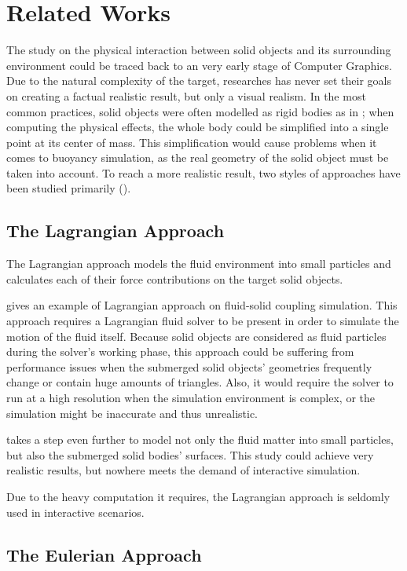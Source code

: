 \section{Related Works}

The study on the physical interaction between solid objects and its surrounding environment could be traced back to an very early stage of Computer Graphics.
Due to the natural complexity of the target, researches has never set their goals on creating a factual realistic result, but only a visual realism.
In the most common practices, solid objects were often modelled as rigid bodies as in \cite{BAR01}; when computing the physical effects, the whole body could be simplified into a single point at its center of mass.
This simplification would cause problems when it comes to buoyancy simulation, as the real geometry of the solid object must be taken into account.
To reach a more realistic result, two styles of approaches have been studied primarily (\cite{GOU09}).

\subsection{The Lagrangian Approach}

The Lagrangian approach models the fluid environment into small particles and calculates each of their force contributions on the target solid objects.

\cite{CAR04} gives an example of Lagrangian approach on fluid-solid coupling simulation.
This approach requires a Lagrangian fluid solver to be present in order to simulate the motion of the fluid itself.
Because solid objects are considered as fluid particles during the solver's working phase, this approach could be suffering from performance issues when the submerged solid objects' geometries frequently change or contain huge amounts of triangles.
Also, it would require the solver to run at a high resolution when the simulation environment is complex, or the simulation might be inaccurate and thus unrealistic.

\cite{AKI12} takes a step even further to model not only the fluid matter into small particles, but also the submerged solid bodies' surfaces.
This study could achieve very realistic results, but nowhere meets the demand of interactive simulation.

Due to the heavy computation it requires, the Lagrangian approach is seldomly used in interactive scenarios.

\subsection{The Eulerian Approach}

